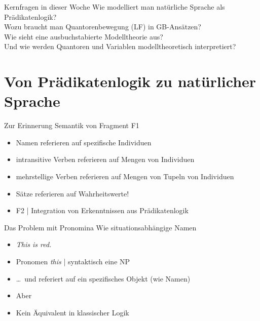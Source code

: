 \begin{frame}
  {Kernfragen in dieser Woche}
  \onslide<+->
  \onslide<+->
  \centering 
  \Large
  Wie modelliert man natürliche Sprache als Prädikatenlogik?\\
  \onslide<+->
  \Halbzeile
  Wozu braucht man \alert{Quantorenbewegung (LF)} in GB-Ansätzen?\\
  \onslide<+->
  \Halbzeile
  Wie sieht eine ausbuchstabierte \alert{Modelltheorie} aus?\\
  Und wie werden Quantoren und Variablen modelltheoretisch interpretiert?\\
  \onslide<+->
  \Halbzeile
\end{frame}

\section{Von Prädikatenlogik zu natürlicher Sprache}

\begin{frame}
  {Zur Erinnerung}
  \onslide<+->
  \onslide<+->
  Semantik von Fragment F1\\
  \Halbzeile
  \begin{itemize}[<+->]
    \item Namen referieren auf \alert{spezifische Individuen}
    \item intransitive Verben referieren auf \alert{Mengen von Individuen}
    \item mehrstellige Verben referieren auf Mengen von \alert{Tupeln von Individuen}
    \item Sätze referieren auf \alert{Wahrheitswerte}!
      \Halbzeile
    \item F2 | Integration von Erkenntnissen aus Prädikatenlogik
  \end{itemize}
\end{frame}

\begin{frame}
  {Das Problem mit Pronomina}
  \onslide<+->
  \onslide<+->
  Wie situationsabhängige Namen\\
  \Halbzeile
  \begin{itemize}[<+->]
    \item[ ] \textit{\alert{This} is red.}
    \item Pronomen \alert{\textit{this}} | syntaktisch eine NP
    \item \ldots\ und referiert auf \alert{ein spezifisches Objekt} (wie Namen)\\
      \Halbzeile
    \item Aber \\
    \item Kein Äquivalent in klassischer Logik
  \end{itemize}
\end{frame}

